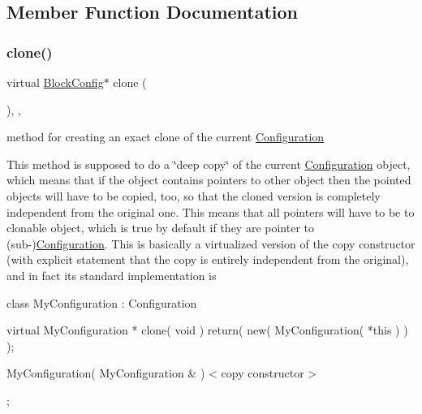\subsection{Member Function Documentation}
\mbox{\label{class_s_m_spp__di__unipi__it_1_1_block_config_aad48f22d1d55c91173132511df58c35b}} 
\subsubsection{\texorpdfstring{clone()}{clone()}}
{\footnotesize\ttfamily virtual \mbox{\hyperlink{class_s_m_spp__di__unipi__it_1_1_block_config}{Block\+Config}}$\ast$ clone (\begin{DoxyParamCaption}\item[{void}]{ }\end{DoxyParamCaption})\hspace{0.3cm}{\ttfamily [inline]}, {\ttfamily [override]}, {\ttfamily [virtual]}}



method for creating an exact clone of the current \mbox{\hyperlink{class_s_m_spp__di__unipi__it_1_1_configuration}{Configuration}} 

This method is supposed to do a \char`\"{}deep copy\char`\"{} of the current \mbox{\hyperlink{class_s_m_spp__di__unipi__it_1_1_configuration}{Configuration}} object, which means that if the object contains pointers to other object then the pointed objects will have to be copied, too, so that the cloned version is completely independent from the original one. This means that all pointers will have to be to clonable object, which is true by default if they are pointer to (sub-\/)\mbox{\hyperlink{class_s_m_spp__di__unipi__it_1_1_configuration}{Configuration}}. This is basically a virtualized version of the copy constructor (with explicit statement that the copy is entirely independent from the original), and in fact its standard implementation is \begin{DoxyVerb}class MyConfiguration : Configuration {
 virtual MyConfiguration * clone( void ) {
 return( new( MyConfiguration( *this ) ) );
 }

 MyConfiguration( MyConfiguration & ) { < copy constructor > }
 };
\end{DoxyVerb}


